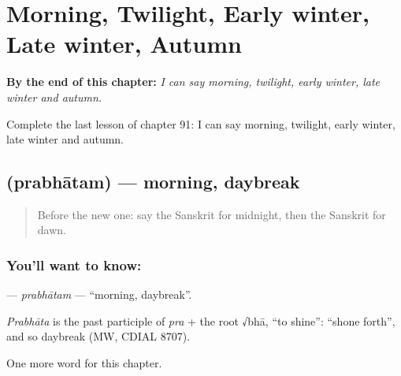 
\chapter{Morning, Twilight, Early winter, Late winter, Autumn}
\label{ch:sa-morning-twilight-early-winter-late-winter-autumn}

\begin{chapteropening}
\textbf{By the end of this chapter:} \emph{I can say morning, twilight, early winter, late winter and autumn.}

Complete the last lesson of chapter 91: I can say morning, twilight, early winter, late winter and autumn.
\end{chapteropening}

\section[\texorpdfstring{\sk{प्रभातम्} (prabhātam)}{प्रभातम् (prabhātam)}]{ (prabhātam) — morning, daybreak}

\label{lesson:SA-C91-prabhatam}



\begin{quote}
Before the new one: say the Sanskrit for midnight, then the Sanskrit for dawn.
\end{quote}

\subsection*{You'll want to know: }
\textbf{} — \emph{prabhātam} — \textquotedblleft{}morning, daybreak\textquotedblright{}.

\begin{cousinweb}
\emph{Prabhāta} is the past participle of \emph{pra} + the root √bhā, \textquotedblleft{}to shine\textquotedblright{}: \textquotedblleft{}shone forth\textquotedblright{}, and so daybreak (MW, CDIAL 8707).
\end{cousinweb}

\begin{grammarlens}[title={What you've built}]
One more word for this chapter.
\end{grammarlens}


